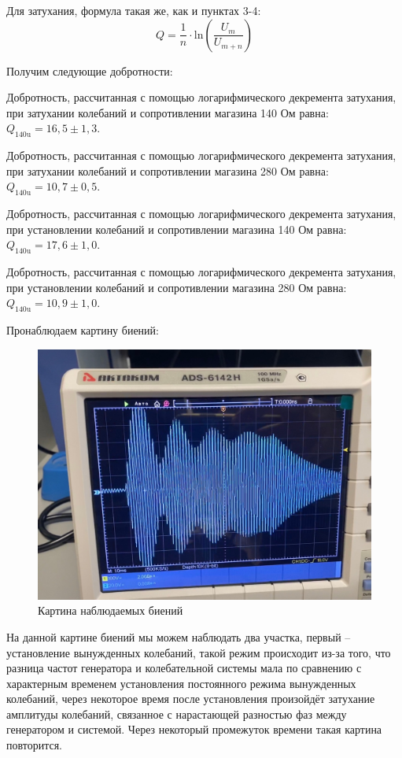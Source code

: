 \documentclass[a4paper,12pt]{extarticle}
\begin{document}
Для затухания, формула такая же, как и пунктах 3-4:
\begin{equation}
    Q = \frac{1}{n} \cdot \text{ln}(\frac{U_m}{U_{m+n}})
\end{equation}

Получим следующие добротности:

Добротность, рассчитанная с помощью логарифмического декремента затухания, при затухании колебаний и сопротивлении магазина 140 Ом равна: $Q_\text{140u} = 16,5 \pm 1,3.$

Добротность, рассчитанная с помощью логарифмического декремента затухания, при затухании колебаний и сопротивлении магазина 280 Ом равна: $Q_\text{140u} = 10,7 \pm 0,5.$

Добротность, рассчитанная с помощью логарифмического декремента затухания, при установлении колебаний и сопротивлении магазина 140 Ом равна: $Q_\text{140u} = 17,6 \pm 1,0.$

Добротность, рассчитанная с помощью логарифмического декремента затухания, при установлении колебаний и сопротивлении магазина 280 Ом равна: $Q_\text{140u} = 10,9 \pm 1,0.$

Пронаблюдаем картину биений:
\begin{figure}[h!]
    \centering
    \includegraphics[width=0.8\linewidth]{bien.jpg}
    \caption{Картина наблюдаемых биений}
\end{figure}

На данной картине биений мы можем наблюдать два участка, первый -- установление вынужденных колебаний, такой режим происходит из-за того, что разница частот генератора и колебательной системы мала по сравнению с характерным временем установления постоянного режима вынужденных колебаний, через некоторое время после установления произойдёт затухание амплитуды колебаний, связанное с нарастающей разностью фаз между генератором и системой. Через некоторый промежуток времени такая картина повторится.
\end{document}
